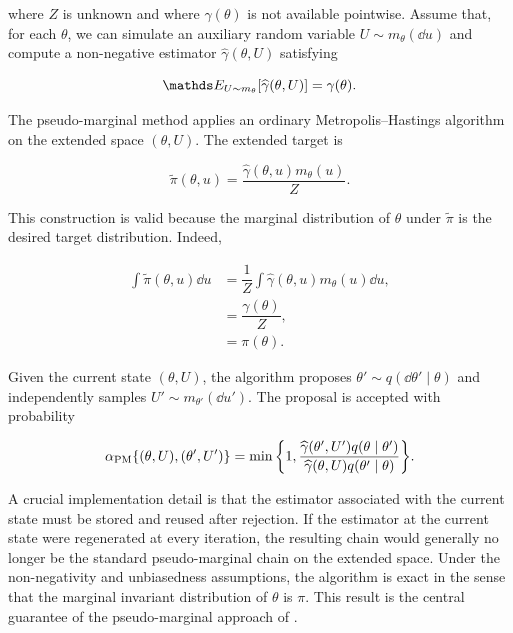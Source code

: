 where $Z$ is unknown and where $\gamma(\theta)$ is not available pointwise.
Assume that, for each $\theta$, we can simulate an auxiliary random variable $U \sim m_\theta(\dd u)$ and compute a non-negative estimator $\widehat{\gamma}(\theta, U)$ satisfying

\begin{equation}
    \bE_{U \sim m_\theta}
    \qty[
        \widehat{\gamma}(\theta, U)
    ]
    =
    \gamma(\theta).
\end{equation}

The pseudo-marginal method applies an ordinary Metropolis--Hastings algorithm on the extended space $(\theta, U)$.
The extended target is

\begin{equation}
    \widetilde{\pi}(\theta, u)
    =
    \dfrac{\widehat{\gamma}(\theta, u) m_\theta(u)}{Z}.
\end{equation}

This construction is valid because the marginal distribution of $\theta$ under $\widetilde{\pi}$ is the desired target distribution.
Indeed,

\begin{align}
    \int \widetilde{\pi}(\theta, u) \dd u
    &=
    \dfrac{1}{Z}
    \int
    \widehat{\gamma}(\theta, u) m_\theta(u) \dd u,
    \\
    &=
    \dfrac{\gamma(\theta)}{Z},
    \\
    &=
    \pi(\theta).
\end{align}

Given the current state $(\theta, U)$, the algorithm proposes $\theta' \sim q(\dd\theta' \mid \theta)$ and independently samples $U' \sim m_{\theta'}(\dd u')$.
The proposal is accepted with probability

\begin{equation}
    \alpha_{\mathrm{PM}}
    \qty{
        (\theta, U),
        (\theta', U')
    }
    =
    \min
    \qty{
        1,
        \dfrac{
            \widehat{\gamma}(\theta', U')
            q(\theta \mid \theta')
        }{
            \widehat{\gamma}(\theta, U)
            q(\theta' \mid \theta)
        }
    }.
\end{equation}

A crucial implementation detail is that the estimator associated with the current state must be stored and reused after rejection.
If the estimator at the current state were regenerated at every iteration, the resulting chain would generally no longer be the standard pseudo-marginal chain on the extended space.
Under the non-negativity and unbiasedness assumptions, the algorithm is exact in the sense that the marginal invariant distribution of $\theta$ is $\pi$.
This result is the central guarantee of the pseudo-marginal approach of .

